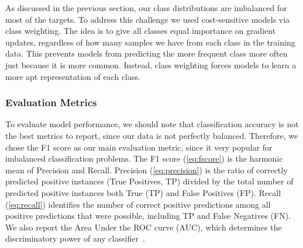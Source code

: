 \documentclass[sn-mathphys, pdflatex]{sn-jnl}
\begin{document}
As discussed in the previous section, our class distributions are imbalanced for most of the targets.
To address this challenge we used cost-sensitive models via class weighting.
The idea is to give all classes equal importance on gradient updates,
regardless of how many samples we have from each class in the training data.
This prevents models from predicting the more frequent class more often just because it is more common.
Instead, class weighting forces models to learn a more apt representation of each class.


\subsubsection{Evaluation Metrics}

To evaluate model performance,
we should note that classification accuracy is not the best metrics to report,
since our data is not perfectly balanced.
Therefore, we chose the F1 score as our main evaluation metric,
since it very popular for imbalanced classification problems.
The F1 score (\autoref{eq:fscore}) is the harmonic mean of Precision and Recall.
Precision (\autoref{eq:precision}) is the ratio of correctly predicted positive instances (True Positives, TP)
divided by the total number of predicted positive instances both True (TP) and False Positives (FP).
Recall (\autoref{eq:recall}) identifies the number of correct positive predictions
among all positive predictions that were possible, including TP and False Negatives (FN).
We also report the Area Under the ROC curve (AUC),
which determines the discriminatory power of any classifier~\cite{Powers11}.

\end{document}
